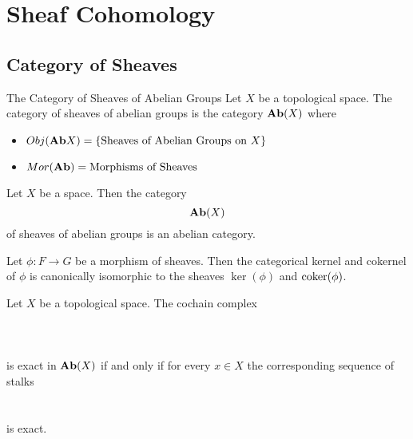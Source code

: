 \documentclass[a4paper]{article}
\begin{document}
\pagebreak
\section{Sheaf Cohomology}
\subsection{Category of Sheaves}
\begin{defn}{The Category of Sheaves of Abelian Groups}{} Let $X$ be a topological space. The category of sheaves of abelian groups is the category $\bold{Ab}(X)$ where
\begin{itemize}
\item $Obj(\bold{Ab}X)=\{\text{Sheaves of Abelian Groups on }X\}$
\item $Mor(\bold{Ab})=\text{Morphisms of Sheaves}$
\end{itemize}
\end{defn}

\begin{prp}{}{} Let $X$ be a space. Then the category $$\bold{Ab}(X)$$ of sheaves of abelian groups is an abelian category. 
\end{prp}

\begin{prp}{}{} Let $\phi:F\to G$ be a morphism of sheaves. Then the categorical kernel and cokernel of $\phi$ is canonically isomorphic to the sheaves $\ker(\phi)$ and $\operatorname{coker}(\phi)$. 
\end{prp}

\begin{prp}{}{} Let $X$ be a topological space. The cochain complex \\~\\
 \\~\\
is exact in $\bold{Ab}(X)$ if and only if for every $x\in X$ the corresponding sequence of stalks \\
 \\~\\
is exact. 
\end{prp}
\end{document}

